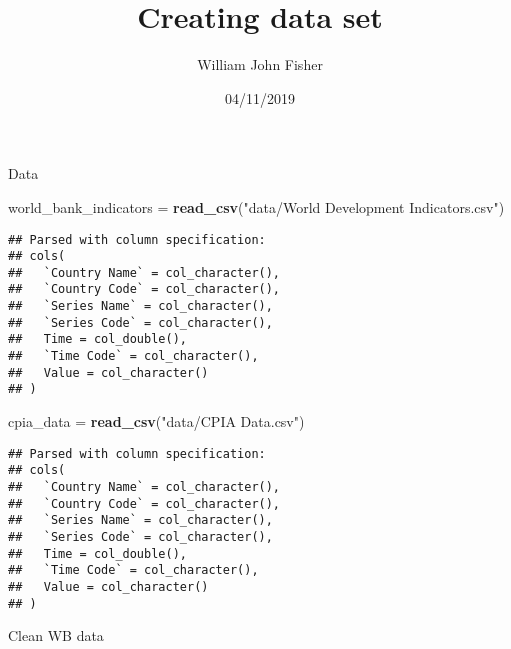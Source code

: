 \documentclass[]{article}
\title{Creating data set}
\author{William John Fisher}
\date{04/11/2019}
\newenvironment{Shaded}{\begin{snugshade}}{\end{snugshade}}
\newcommand{\DataTypeTok}[1]{\textcolor[rgb]{0.13,0.29,0.53}{#1}}
\newcommand{\KeywordTok}[1]{\textcolor[rgb]{0.13,0.29,0.53}{\textbf{#1}}}
\newcommand{\NormalTok}[1]{#1}
\newcommand{\OperatorTok}[1]{\textcolor[rgb]{0.81,0.36,0.00}{\textbf{#1}}}
\newcommand{\StringTok}[1]{\textcolor[rgb]{0.31,0.60,0.02}{#1}}
\begin{document}
\maketitle

Data

\begin{Shaded}
\begin{Highlighting}[]
\NormalTok{world_bank_indicators =}\StringTok{ }\KeywordTok{read_csv}\NormalTok{(}\StringTok{"data/World Development Indicators.csv"}\NormalTok{)}
\end{Highlighting}
\end{Shaded}

\begin{verbatim}
## Parsed with column specification:
## cols(
##   `Country Name` = col_character(),
##   `Country Code` = col_character(),
##   `Series Name` = col_character(),
##   `Series Code` = col_character(),
##   Time = col_double(),
##   `Time Code` = col_character(),
##   Value = col_character()
## )
\end{verbatim}

\begin{Shaded}
\begin{Highlighting}[]
\NormalTok{cpia_data =}\StringTok{ }\KeywordTok{read_csv}\NormalTok{(}\StringTok{"data/CPIA Data.csv"}\NormalTok{)}
\end{Highlighting}
\end{Shaded}

\begin{verbatim}
## Parsed with column specification:
## cols(
##   `Country Name` = col_character(),
##   `Country Code` = col_character(),
##   `Series Name` = col_character(),
##   `Series Code` = col_character(),
##   Time = col_double(),
##   `Time Code` = col_character(),
##   Value = col_character()
## )
\end{verbatim}

Clean WB data

\begin{Shaded}
\end{Shaded}
\end{document}
